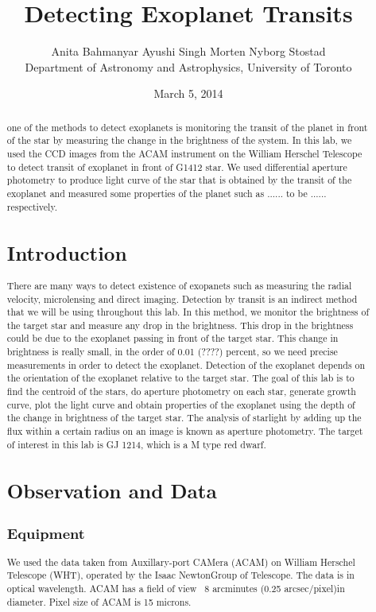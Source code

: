\documentclass[letterpaper,12pt]{article}
\title{Detecting Exoplanet Transits}
\author{Anita Bahmanyar \qquad Ayushi Singh \qquad Morten Nyborg Stostad \\Department of Astronomy and Astrophysics, University of Toronto}
\affil{\small {Written by: Anita Bahmanyar}}
\affil{\small {anita.bahmanyar@mail.utoronto.ca}}
\affil{\small {Student Number: 998909098}}
\date{March 5, 2014}
\begin{document}
\maketitle

\begin{abstract}
\label{abstract}
one of the methods to detect exoplanets is monitoring the transit of the planet in front of the star by measuring the change in the  brightness of the system. In this lab, we used the CCD images from the ACAM instrument on the William Herschel Telescope to detect transit of exoplanet in front of G1412 star. We used differential aperture photometry to produce light curve of the star that is obtained by the transit of the exoplanet and measured some properties of the planet such as ...... to be ...... respectively.


\section{Introduction}
\label{sec:introduction}
There are many ways to detect existence of exopanets such as measuring the radial velocity, microlensing and direct imaging. Detection by transit is an indirect method that we will be using throughout this lab. In this method, we monitor the brightness of the target star and measure any drop in the brightness. This drop in the brightness could be due to the exoplanet passing in front of the target star. This change in brightness is really small, in the order of 0.01 (????) percent, so we need precise measurements in order to detect the exoplanet. Detection of the exoplanet depends on the orientation of the exoplanet relative to the target star. The goal of this lab is to find the centroid of the stars, do aperture photometry on each star, generate growth curve, plot the light curve and obtain properties of the exoplanet using the depth of the change in brightness of the target star. The analysis of starlight by adding up the flux within a certain radius on an image is known as aperture photometry.  The target of interest in this lab is GJ 1214, which is a M type red dwarf.


%
\section{Observation and Data}
\label{sec:observationanddata}

\subsection{Equipment}
We used the data taken from  Auxillary-port CAMera (ACAM) on William Herschel  Telescope (WHT), operated by the Isaac NewtonGroup of Telescope. The data is in optical wavelength. ACAM has a field of view  ~8 arcminutes (0.25 arcsec/pixel)in diameter. Pixel size of ACAM is 15 microns.




\end{abstract}
\end{document}
